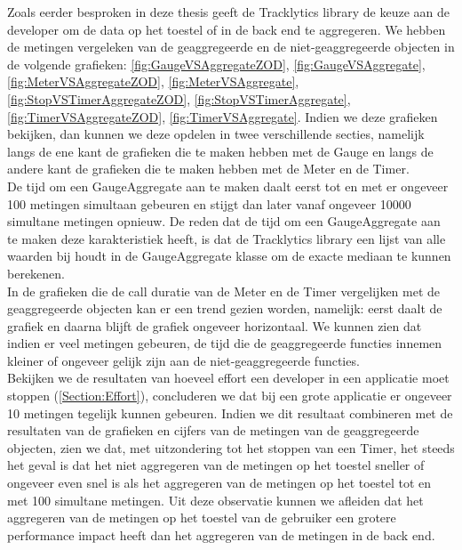 Zoals eerder besproken in deze thesis geeft de Tracklytics library de keuze aan de developer om de data op het toestel of in de back end te aggregeren. We hebben de metingen vergeleken van de geaggregeerde en de niet-geaggregeerde objecten in de volgende grafieken: \ref{fig:GaugeVSAggregateZOD}, \ref{fig:GaugeVSAggregate}, \ref{fig:MeterVSAggregateZOD}, \ref{fig:MeterVSAggregate}, \ref{fig:StopVSTimerAggregateZOD}, \ref{fig:StopVSTimerAggregate}, \ref{fig:TimerVSAggregateZOD}, \ref{fig:TimerVSAggregate}. Indien we deze grafieken bekijken, dan kunnen we deze opdelen in twee verschillende secties, namelijk langs de ene kant de grafieken die te maken hebben met de Gauge en langs de andere kant de grafieken die te maken hebben met de Meter en de Timer. \\

De tijd om een GaugeAggregate aan te maken daalt eerst tot en met er ongeveer 100 metingen simultaan gebeuren en stijgt dan later vanaf ongeveer 10000 simultane metingen opnieuw. De reden dat de tijd om een GaugeAggregate aan te maken deze karakteristiek heeft, is dat de Tracklytics library een lijst van alle waarden bij houdt in de GaugeAggregate klasse om de exacte mediaan te kunnen berekenen. \\

In de grafieken die de call duratie van de Meter en de Timer vergelijken met de geaggregeerde objecten kan er een trend gezien worden, namelijk: eerst daalt de grafiek en daarna blijft de grafiek ongeveer horizontaal. We kunnen zien dat indien er veel metingen gebeuren, de tijd die de geaggregeerde functies innemen kleiner of ongeveer gelijk zijn aan de niet-geaggregeerde functies. \\


Bekijken we de resultaten van hoeveel effort een developer in een applicatie moet stoppen (\ref{Section:Effort}), concluderen we dat bij een grote applicatie er ongeveer 10 metingen tegelijk kunnen gebeuren. Indien we dit resultaat combineren met de resultaten van de grafieken en cijfers van de metingen van de geaggregeerde objecten, zien we dat, met uitzondering tot het stoppen van een Timer, het steeds het geval is dat het niet aggregeren van de metingen op het toestel sneller of ongeveer even snel is als het aggregeren van de metingen op het toestel tot en met 100 simultane metingen. Uit deze observatie kunnen we afleiden dat het aggregeren van de metingen op het toestel van de gebruiker een grotere performance impact heeft dan het aggregeren van de metingen in de back end. \\

